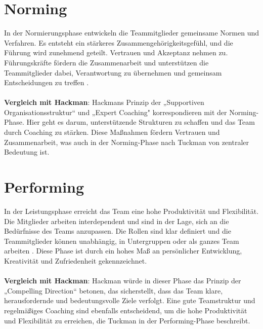 \section{Norming}
In der Normierungsphase entwickeln die Teammitglieder gemeinsame Normen und Verfahren. Es entsteht ein stärkeres Zusammengehörigkeitsgefühl, und die Führung wird zunehmend geteilt. Vertrauen und Akzeptanz nehmen zu. Führungskräfte fördern die Zusammenarbeit und unterstützen die Teammitglieder dabei, Verantwortung zu übernehmen und gemeinsam Entscheidungen zu treffen \cite{WESTCHETERUNIVERSITY}.\\\\
\textbf{Vergleich mit Hackman}: Hackmans Prinzip der „Supportiven Organisationsstruktur“ und „Expert Coaching" korrespondieren mit der Norming-Phase. Hier geht es darum, unterstützende Strukturen zu schaffen und das Team durch Coaching zu stärken. Diese Maßnahmen fördern Vertrauen und Zusammenarbeit, was auch in der Norming-Phase nach Tuckman von zentraler Bedeutung ist.

\section{Performing}
In der Leistungsphase erreicht das Team eine hohe Produktivität und Flexibilität. Die Mitglieder arbeiten interdependent und sind in der Lage, sich an die Bedürfnisse des Teams anzupassen. Die Rollen sind klar definiert und die Teammitglieder können unabhängig, in Untergruppen oder als ganzes Team arbeiten \cite{WESTCHETERUNIVERSITY}. Diese Phase ist durch ein hohes Maß an persönlicher Entwicklung, Kreativität und Zufriedenheit gekennzeichnet.\\\\
\textbf{Vergleich mit Hackman}: Hackman würde in dieser Phase das Prinzip der „Compelling Direction“ betonen, das sicherstellt, dass das Team klare, herausfordernde und bedeutungsvolle Ziele verfolgt. Eine gute Teamstruktur und regelmäßiges Coaching sind ebenfalls entscheidend, um die hohe Produktivität und Flexibilität zu erreichen, die Tuckman in der Performing-Phase beschreibt.

